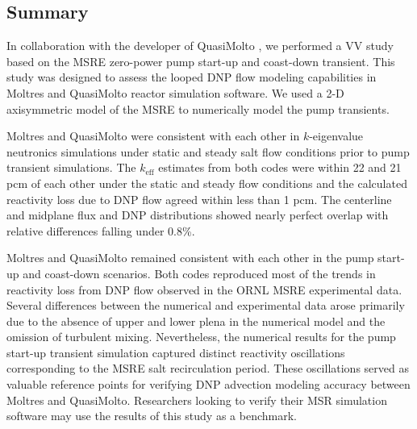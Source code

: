 \subsection{Summary}

In collaboration with the developer of QuasiMolto \cite{reynolds_analysis_2023}, we performed a
\gls{VV} study based on the \gls{MSRE}
zero-power pump start-up and coast-down transient. This study was designed to assess
the looped \gls{DNP} flow modeling capabilities in Moltres and QuasiMolto reactor simulation
software. We used a 2-D axisymmetric model of the \gls{MSRE} to numerically model the pump
transients.

Moltres and QuasiMolto were consistent with each other in $k$-eigenvalue neutronics simulations
under static and steady salt flow conditions prior to pump transient simulations. The
$k_\text{eff}$ estimates from both codes were within 22 and 21 pcm of each other under the static
and steady flow conditions and the calculated reactivity loss due to \gls{DNP} flow agreed within
less than 1 pcm. The centerline and midplane flux and \gls{DNP} distributions showed nearly perfect
overlap with relative differences falling under 0.8\%.

Moltres and QuasiMolto remained consistent with each other in the pump start-up and
coast-down scenarios. Both codes reproduced most of the trends in reactivity loss from \gls{DNP}
flow observed in the \gls{ORNL}
\gls{MSRE} experimental data. Several differences between the numerical and experimental data arose
primarily due to the absence of upper and lower plena in the numerical model and the omission of
turbulent mixing. Nevertheless, the numerical results for the pump start-up transient
simulation captured distinct reactivity oscillations corresponding to the \gls{MSRE} salt
recirculation period. These oscillations served as valuable reference points for verifying \gls{DNP}
advection modeling accuracy between Moltres and QuasiMolto. Researchers looking to verify
their \gls{MSR} simulation software may use the results of this study as a benchmark.

\FloatBarrier
